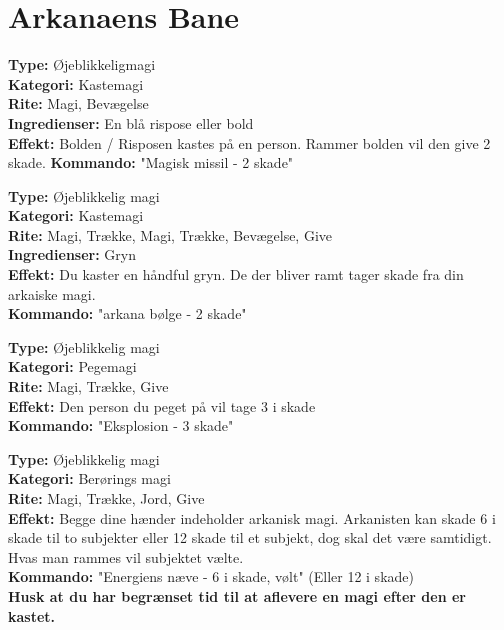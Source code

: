 \section*{Arkanaens Bane}
\begin{arkBaneMagi*}
\textbf{Type:} Øjeblikkeligmagi\\
\textbf{Kategori:} Kastemagi\\
\textbf{Rite:} Magi, Bevægelse\\
\textbf{Ingredienser:} En blå rispose eller bold \\
\textbf{Effekt:} Bolden / Risposen kastes på en person. Rammer bolden vil den give 2 skade.
\textbf{Kommando:} "Magisk missil - 2 skade"
\end{arkBaneMagi*}

\begin{arkBaneMagi*}
\textbf{Type:} Øjeblikkelig magi\\
\textbf{Kategori:} Kastemagi\\
\textbf{Rite:} Magi, Trække, Magi, Trække, Bevægelse, Give\\
\textbf{Ingredienser:} Gryn\\
\textbf{Effekt:} Du kaster en håndful gryn. De der bliver ramt tager skade fra din arkaiske magi.\\
\textbf{Kommando:} "arkana bølge - 2 skade"
\end{arkBaneMagi*}

\begin{arkBaneMagi*}[Eksplosion]
\textbf{Type:} Øjeblikkelig magi\\
\textbf{Kategori:} Pegemagi\\
\textbf{Rite:} Magi, Trække, Give\\
\textbf{Effekt:} Den person du peget på vil tage 3 i skade\\
\textbf{Kommando:} "Eksplosion - 3 skade"
\end{arkBaneMagi*}

\begin{arkBaneMagi*}
\textbf{Type:} Øjeblikkelig magi\\
\textbf{Kategori:} Berørings magi\\
\textbf{Rite:} Magi, Trække, Jord, Give\\
\textbf{Effekt:} Begge dine hænder indeholder arkanisk magi. Arkanisten kan skade 6 i skade til to subjekter eller 12 skade til et subjekt, dog skal det være samtidigt. Hvas man rammes vil subjektet vælte.\\
\textbf{Kommando:} "Energiens næve - 6 i skade, vølt" (Eller 12 i skade)\\
\textbf{Husk at du har begrænset tid til at aflevere en magi efter den er kastet.}
\end{arkBaneMagi*}

